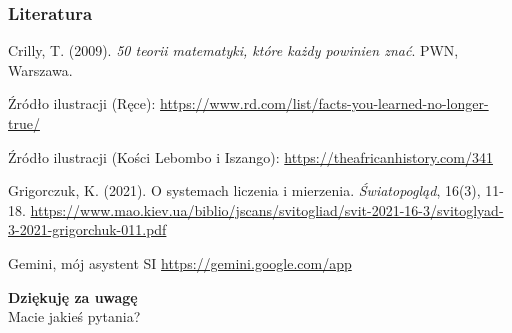 \documentclass[12pt]{beamer}
\theoremstyle{plain}
\begin{document}
\begin{frame}
\frametitle{Literatura}
\footnotesize %
\begin{thebibliography}{2}

Crilly, T. (2009). {\em 50 teorii matematyki, które każdy powinien znać}. PWN, Warszawa.

 Źródło ilustracji (Ręce):
\url{https://www.rd.com/list/facts-you-learned-no-longer-true/} 

 Źródło ilustracji (Kości Lebombo i Iszango):
\url{https://theafricanhistory.com/341}

 Grigorczuk, K. (2021). O systemach liczenia i mierzenia. \textit{Światopogląd}, 16(3), 11-18.
\url{https://www.mao.kiev.ua/biblio/jscans/svitogliad/svit-2021-16-3/svitoglyad-3-2021-grigorchuk-011.pdf}

 Gemini, mój asystent SI
\url{https://gemini.google.com/app}

\end{thebibliography}
\end{frame}

\begin{frame}
    \vfill %
    
    \begin{center}
        \Huge\textbf{Dziękuję za uwagę} \\
        \vspace{1cm}
        \Large Macie jakieś pytania?
    \end{center}
    \vfill %
\end{frame}
\end{document}
